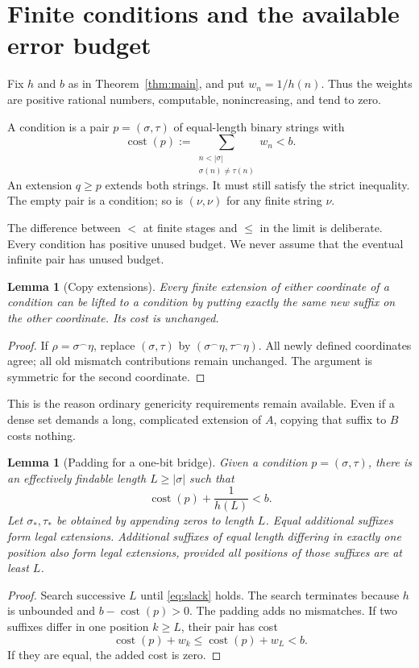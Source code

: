 \documentclass[11pt,a4paper]{article}
\newcommand{\cost}{\operatorname{cost}}
\newcommand{\concat}{\mathbin{{}^{\frown}}}
\newtheorem{lemma}[theorem]{Lemma}
\theoremstyle{definition}
\theoremstyle{remark}
\begin{document}
\section{Finite conditions and the available error budget}\label{sec:forcing}
Fix $h$ and $b$ as in Theorem~\ref{thm:main}, and put $w_n=1/h(n)$. Thus the weights are positive rational numbers, computable, nonincreasing, and tend to zero.

A condition is a pair $p=(\sigma,\tau)$ of equal-length binary strings with
\begin{equation}\label{eq:condition}
\cost(p):=\sum_{\substack{n<|\sigma|\\\sigma(n)\ne\tau(n)}}w_n<b.
\end{equation}
An extension $q\geq p$ extends both strings. It must still satisfy the strict inequality. The empty pair is a condition; so is $(\nu,\nu)$ for any finite string $\nu$.

The difference between $<$ at finite stages and $\leq$ in the limit is deliberate. Every condition has positive unused budget. We never assume that the eventual infinite pair has unused budget.

\begin{lemma}[Copy extensions]\label{lem:copy}
Every finite extension of either coordinate of a condition can be lifted to a condition by putting exactly the same new suffix on the other coordinate. Its cost is unchanged.
\end{lemma}
\begin{proof}
If $\rho=\sigma\concat\eta$, replace $(\sigma,\tau)$ by $(\sigma\concat\eta,\tau\concat\eta)$. All newly defined coordinates agree; all old mismatch contributions remain unchanged. The argument is symmetric for the second coordinate.
\end{proof}

This is the reason ordinary genericity requirements remain available. Even if a dense set demands a long, complicated extension of $A$, copying that suffix to $B$ costs nothing.

\begin{lemma}[Padding for a one-bit bridge]\label{lem:padding}
Given a condition $p=(\sigma,\tau)$, there is an effectively findable length $L\geq|\sigma|$ such that
\begin{equation}\label{eq:slack}
\cost(p)+\frac1{h(L)}<b.
\end{equation}
Let $\sigma_*,\tau_*$ be obtained by appending zeros to length $L$. Equal additional suffixes form legal extensions. Additional suffixes of equal length differing in exactly one position also form legal extensions, provided all positions of those suffixes are at least $L$.
\end{lemma}
\begin{proof}
Search successive $L$ until \eqref{eq:slack} holds. The search terminates because $h$ is unbounded and $b-\cost(p)>0$. The padding adds no mismatches. If two suffixes differ in one position $k\geq L$, their pair has cost
\[
\cost(p)+w_k\leq\cost(p)+w_L<b.
\]
If they are equal, the added cost is zero.
\end{proof}
\end{document}
